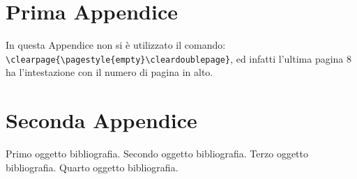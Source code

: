\documentclass[12pt,a4paper,openright,twoside]{report}
\begin{document}
                                        \chapter{Prima Appendice}               %
                                        In questa Appendice non si \`e utilizzato il comando:\\
                                        \verb"\clearpage{\pagestyle{empty}\cleardoublepage}", ed infatti
                                        l'ultima pagina 8 ha l'intestazione con il numero di pagina in
                                        alto.
                                        \chapter{Seconda Appendice}             %
                                        \begin{thebibliography}{90}             %
                                        \rhead[\fancyplain{}{\bfseries \leftmark}]{\fancyplain{}{\bfseries
                                        \thepage}}
                                         Primo oggetto bibliografia.
                                         Secondo oggetto bibliografia.
                                         Terzo oggetto bibliografia.
                                         Quarto oggetto bibliografia.
                                        \end{thebibliography}
                                        \clearpage{\pagestyle{empty}\cleardoublepage}
\end{document}
